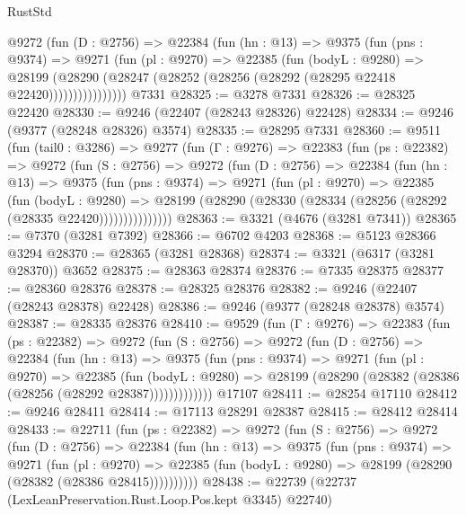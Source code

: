 \begin{lexlean}{RustStd}
\begin{coremodule}
            @9272
              (fun (D : @2756) =>
              @22384
                (fun (hn : @13) =>
                @9375
                  (fun (pns : @9374) =>
                  @9271
                    (fun (pl : @9270) =>
                    @22385
                      (fun (bodyL : @9280) =>
                      @28199
                        (@28290
                          (@28247 (@28252 (@28256 (@28292 (@28295 @22418 @22420))))))))))))))))
    @7331
@28325 := @3278 @7331
@28326 := @28325 @22420
@28330 := @9246 (@22407 (@28243 @28326) @22428)
@28334 := @9246 (@9377 (@28248 @28326) @3574)
@28335 := @28295 @7331
@28360 := @9511
    (fun (tail0 : @3286) =>
    @9277
      (fun (Γ : @9276) =>
      @22383
        (fun (ps : @22382) =>
        @9272
          (fun (S : @2756) =>
          @9272
            (fun (D : @2756) =>
            @22384
              (fun (hn : @13) =>
              @9375
                (fun (pns : @9374) =>
                @9271
                  (fun (pl : @9270) =>
                  @22385
                    (fun (bodyL : @9280) =>
                    @28199 (@28290 (@28330 (@28334 (@28256 (@28292 (@28335 @22420)))))))))))))))
@28363 := @3321 (@4676 (@3281 @7341))
@28365 := @7370 (@3281 @7392)
@28366 := @6702 @4203
@28368 := @5123 @28366 @3294
@28370 := @28365 (@3281 @28368)
@28374 := @3321 (@6317 (@3281 @28370)) @3652
@28375 := @28363 @28374
@28376 := @7335 @28375
@28377 := @28360 @28376
@28378 := @28325 @28376
@28382 := @9246 (@22407 (@28243 @28378) @22428)
@28386 := @9246 (@9377 (@28248 @28378) @3574)
@28387 := @28335 @28376
@28410 := @9529
    (fun (Γ : @9276) =>
    @22383
      (fun (ps : @22382) =>
      @9272
        (fun (S : @2756) =>
        @9272
          (fun (D : @2756) =>
          @22384
            (fun (hn : @13) =>
            @9375
              (fun (pns : @9374) =>
              @9271
                (fun (pl : @9270) =>
                @22385
                  (fun (bodyL : @9280) =>
                  @28199 (@28290 (@28382 (@28386 (@28256 (@28292 @28387)))))))))))))
    @17107
@28411 := @28254 @17110
@28412 := @9246 @28411
@28414 := @17113 @28291 @28387
@28415 := @28412 @28414
@28433 := @22711
    (fun (ps : @22382) =>
    @9272
      (fun (S : @2756) =>
      @9272
        (fun (D : @2756) =>
        @22384
          (fun (hn : @13) =>
          @9375
            (fun (pns : @9374) =>
            @9271
              (fun (pl : @9270) =>
              @22385 (fun (bodyL : @9280) => @28199 (@28290 (@28382 (@28386 @28415))))))))))
@28438 := @22739 (@22737 (LexLeanPreservation.Rust.Loop.Pos.kept @3345) @22740)

\end{coremodule}
\end{lexlean}
